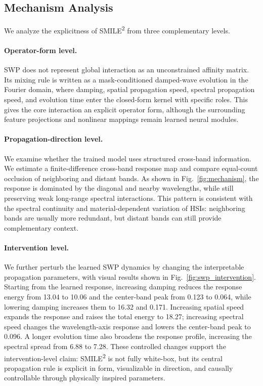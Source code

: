 \documentclass[letterpaper]{article} %
\newcommand{\smiletwo}{SMILE\textsuperscript{2}}
\newcommand{\swp}{\textsc{SWP}}
\begin{document}
\subsection{Mechanism Analysis}

We analyze the explicitness of \smiletwo{} from three complementary levels.

\paragraph{Operator-form level.}
\swp{} does not represent global interaction as an unconstrained affinity matrix.
Its mixing rule is written as a mask-conditioned damped-wave evolution in the Fourier domain, where damping, spatial propagation speed, spectral propagation speed, and evolution time enter the closed-form kernel with specific roles.
This gives the core interaction an explicit operator form, although the surrounding feature projections and nonlinear mappings remain learned neural modules.

\paragraph{Propagation-direction level.}
We examine whether the trained model uses structured cross-band information.
We estimate a finite-difference cross-band response map and compare equal-count occlusion of neighboring and distant bands.
As shown in Fig.~\ref{fig:mechanism}, the response is dominated by the diagonal and nearby wavelengths, while still preserving weak long-range spectral interactions.
This pattern is consistent with the spectral continuity and material-dependent variation of HSIs: neighboring bands are usually more redundant, but distant bands can still provide complementary context.

\paragraph{Intervention level.}
We further perturb the learned \swp{} dynamics by changing the interpretable propagation parameters, with visual results shown in Fig.~\ref{fig:swp_intervention}.
Starting from the learned response, increasing damping reduces the response energy from 13.04 to 10.06 and the center-band peak from 0.123 to 0.064, while lowering damping increases them to 16.32 and 0.171.
Increasing spatial speed expands the response and raises the total energy to 18.27; increasing spectral speed changes the wavelength-axis response and lowers the center-band peak to 0.096.
A longer evolution time also broadens the response profile, increasing the spectral spread from 6.88 to 7.28.
These controlled changes support the intervention-level claim: \smiletwo{} is not fully white-box, but its central propagation rule is explicit in form, visualizable in direction, and causally controllable through physically inspired parameters.
\end{document}
